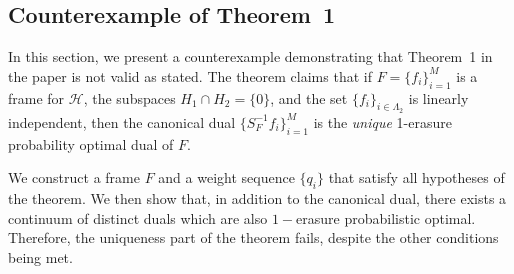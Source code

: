 \documentclass[final,1p,times]{elsarticle}
\begin{document}
\subsection{Counterexample of Theorem~1}

In this section, we present a counterexample demonstrating that Theorem~1 in the paper \cite{li1} is not valid as stated. The theorem claims that if $F = \{f_i\}_{i=1}^M$ is a frame for $\mathcal{H}$, the subspaces $H_1 \cap H_2 = \{0\}$, and the set $\{f_i\}_{i \in \Lambda_2}$ is linearly independent, then the canonical dual $\{S_{F}^{-1}f_i\}_{i=1}^M$ is the \emph{unique} 1-erasure probability optimal dual of $F$. 

We construct a frame $F$ and a weight sequence $\{q_i\}$ that satisfy all hypotheses of the theorem. We then show that, in addition to the canonical dual, there exists a continuum of distinct duals  which are also $1-$erasure probabilistic optimal. Therefore, the uniqueness part of the theorem fails, despite the other conditions being met.
\end{document}
